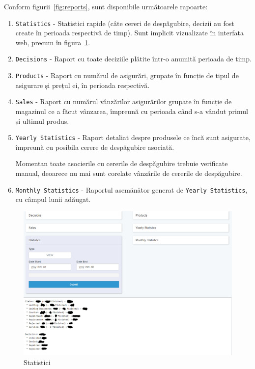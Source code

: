 		Conform figurii~\ref{fig:reports}, sunt disponibile următoarele rapoarte:
		\begin{enumerate}
			\item \verb|Statistics| - Statistici rapide (câte cereri de despăgubire, decizii au fost create în perioada respectivă de timp).
			Sunt implicit vizualizate în interfața web, precum în figura~\ref{fig:statistics}.
			\item \verb|Decisions| - Raport cu toate deciziile plătite într-o anumită perioada de timp.
			\item \verb|Products| - Raport cu numărul de asigurări, grupate în funcție de tipul de asigurare și prețul ei, în perioada respectivă.
			\item \verb|Sales| - Raport cu numărul vânzărilor asigurărilor grupate în funcție de magazinul ce a făcut vânzarea, împreună cu perioada când s-a vândut primul și ultimul produs.
			\item \verb|Yearly Statistics| - Raport detaliat despre produsele ce încă sunt asigurate, împreună cu posibila cerere de despăgubire asociată.

			Momentan toate asocierile cu cererile de despăgubire trebuie verificate manual, deoarece nu mai sunt corelate vânzările de cererile de despăgubire.
			\item \verb|Monthly Statistics| - Raportul asemănător generat de \verb|Yearly Statistics|, cu câmpul lunii adăugat.
		\end{enumerate}

		\begin{figure}
			\includegraphics[width=\linewidth]{../imagini/statistics.png}
			\caption{Statistici}
			\label{fig:statistics}
		\end{figure}

